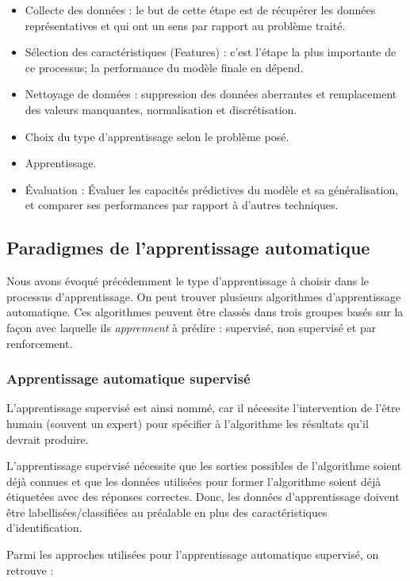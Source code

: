 \begin{itemize}
    \item Collecte des données : le but de cette étape est de récupérer les données représentatives et qui ont un sens par rapport au problème traité.
    \item Sélection des caractéristiques (Features) : c'est l'étape la plus importante de ce processus; la performance du modèle finale en dépend.
    \item Nettoyage de données : suppression des données aberrantes et remplacement des valeurs manquantes, normalisation et discrétisation.
    \item Choix du type d'apprentissage selon le problème posé.
    \item Apprentissage.
    \item Évaluation : Évaluer les capacités prédictives du modèle et sa généralisation, et comparer ses performances par rapport à d'autres techniques.
\end{itemize}

\subsection{Paradigmes de l'apprentissage automatique}
Nous avons évoqué précédemment le type d'apprentissage à choisir dans le processus d'apprentissage. On peut trouver plusieurs algorithmes d'apprentissage automatique. Ces algorithmes peuvent être classés dans trois groupes basés sur la façon avec laquelle ils \emph{apprennent} à prédire : supervisé, non supervisé et par renforcement.

\subsubsection{Apprentissage automatique supervisé}
L'apprentissage supervisé est ainsi nommé, car il nécessite l'intervention de l'être humain (souvent un expert) pour spécifier à l'algorithme les résultats qu'il devrait produire.

L'apprentissage supervisé nécessite que les sorties possibles de l'algorithme soient déjà connues et que les données utilisées pour former l'algorithme soient déjà étiquetées avec des réponses correctes. Donc, les données d'apprentissage doivent être labellisées/classifiées au préalable en plus des caractéristiques d'identification.

Parmi les approches utilisées pour l'apprentissage automatique supervisé, on retrouve :

